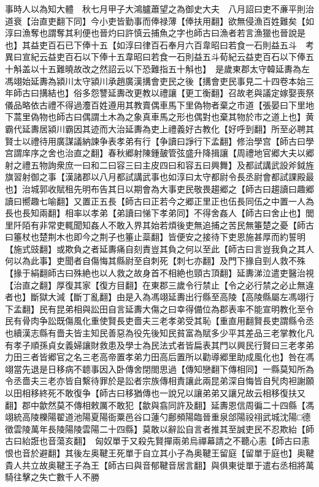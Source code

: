 事時人以為知大體　秋七月甲子大鴻臚蕭望之為御史大夫　八月詔曰吏不亷平則治道衰【治直吏翻下同】今小吏皆勤事而俸禄薄【俸扶用翻】欲無侵漁百姓難矣【如淳曰漁奪也謂奪其利便也晉灼曰許慎云捕魚之字也師古曰漁者若言漁獵也晉說是也】其益吏百石已下俸十五【如淳曰律百石奉月六百韋昭曰若食一石則益五斗　考異曰宣紀云益吏百石以下俸十五韋昭曰若食一石則益五斗荀紀云益吏百石以下俸五十斛盖以十五難曉故改之然詔云以下恐難指五十斛也】　是歲東郡太守韓延夀為左馮翊始延夀為潁川太守潁川承趙廣漢搆會吏民之後【搆會吏民事見二十四卷本始三年師古曰搆結也】俗多怨讐延夀改更教以禮讓【更工衡翻】召故老與議定嫁娶喪祭儀品略依古禮不得過灋百姓遵用其教賣偶車馬下里偽物者棄之市道【張晏曰下里地下蒿里偽物也師古曰偶謂土木為之象真車馬之形也偶對也棄其物於市之道上也】黄霸代延夀居潁川霸因其迹而大治延夀為吏上禮義好古教化【好呼到翻】所至必聘其賢士以禮待用廣謀議納諫争表孝弟有行【争讀曰諍行下孟翻】修治學宫【師古曰學宫謂庠序之舍也治直之翻】春秋郷射陳鍾皷管弦盛升降揖讓【周禮地官郷大夫以郷射之禮五物詢衆庶一曰和二曰容三曰主皮四曰和容五曰興舞】及都試講武設斧鉞旌旗習射御之事【漢諸郡以八月都試講武事也如淳曰太守都尉令長丞尉會都試課殿最也】治城郭收賦租先明布告其日以期會為大事吏民敬畏趨郷之【師古曰趨讀曰趣郷讀曰嚮趣七喻翻】又置正五長【師古曰正若今之郷正里正也伍長同伍之中置一人為長也長知兩翻】相率以孝弟【弟讀曰悌下孝弟同】不得舍姦人【師古曰舍止也】閭里阡陌有非常吏輒聞知姦人不敢入界其始若煩後吏無追捕之苦民無箠楚之憂【師古曰箠杖也楚荆木也即今之荆子也箠止蘂翻】皆便安之接待下吏恩施甚厚而約誓明【施式豉翻】或欺負之者延夀痛自刻責豈其負之何以至此【師古曰言豈我負之其人何以為此事】吏聞者自傷悔其縣尉至自刺死【刺七亦翻】及門下掾自剄人救不殊【掾于絹翻師古曰殊絶也以人救之故身首不相絶也頸古頂翻】延夀涕泣遣吏醫治視【治直之翻】厚復其家【復方目翻】在東郡三歲令行禁止【令之必行禁之必止無違者也】斷獄大減【斷丁亂翻】由是入為馮翊延夀出行縣至高陵【高陵縣屬左馮翊行下孟翻】民有昆弟相與訟田自言延夀大傷之曰幸得備位為郡表率不能宣明教化至令民有骨肉争訟既傷風化重使賢長吏嗇夫三老孝弟受其恥【重直用翻賢長吏謂縣令丞也續漢志縣有嗇夫皆主知民善惡為役先後知民貧富為賦多少平其差品三老掌教化凡有孝子順孫貞女義婦讓財救患及學士為民法式者皆扁表其門以興民行賢曰三老孝弟力田三者皆郷官之名三老高帝置孝弟力田高后置所以勸導郷里助成風化也】咎在馮翊當先退是日移病不聼事因入卧傳舍閉閤思過【傳知戀翻下傳相同】一縣莫知所為令丞嗇夫三老亦皆自繫待罪於是訟者宗族傳相責讓此兩昆弟深自悔皆自髠肉袒謝願以田相移終死不敢復争【師古曰移猶傳也一說兄以讓弟弟又讓兄故云相移復扶又翻】郡中歙然莫不傳相敕厲不敢犯【歙與翕同許及翻】延夀恩信周徧二十四縣【馮翊統高陵櫟陽翟道池陽夏陽衙粟邑谷口蓮勺鄜頻陽臨晉重泉郃陽祋祤武城沈陽□德徵雲陵萬年長陵陽陵雲陽二十四縣】莫敢以辭訟自言者推其至誠吏民不忍欺紿【師古曰紿誑也音蕩亥翻】　匈奴單于又殺先賢撣兩弟烏禪幕請之不聽心恚【師古曰恚恨也音於避翻】其後左奥鞬王死單于自立其小子為奥鞬王留庭【留單于庭也】奥鞬貴人共立故奥鞬王子為王【師古曰與音郁鞬音居言翻】與俱東徙單于遣右丞相將萬騎往擊之失亡數千人不勝

